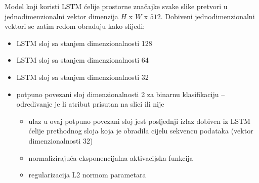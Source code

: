 \documentclass[times, utf8, diplomski, numeric]{fer}
\begin{document}
Model koji koristi LSTM ćelije prostorne značajke svake slike pretvori u jednodimenzionalni vektor dimenzija $H$ x $W$ x $512$.
Dobiveni jednodimenzionalni vektori se zatim redom obrađuju kako slijedi:
\begin{itemize}
 \item LSTM sloj sa stanjem dimenzionalnosti 128
 \item LSTM sloj sa stanjem dimenzionalnosti 64
 \item LSTM sloj sa stanjem dimenzionalnosti 32
  \item potpuno povezani sloj dimenzionalnosti 2 za binarnu klasifikaciju -- određivanje je li atribut prisutan na slici ili nije
 \begin{itemize}
  \item ulaz u ovaj potpuno povezani sloj jest posljednji izlaz dobiven iz LSTM ćelije prethodnog sloja koja je obradila cijelu sekvencu podataka (vektor dimenzionalnosti 32)
  \item normalizirajuća eksponencijalna  aktivacijska funkcija
  \item regularizacija L2 normom parametara
 \end{itemize}
\end{itemize}
\end{document}
